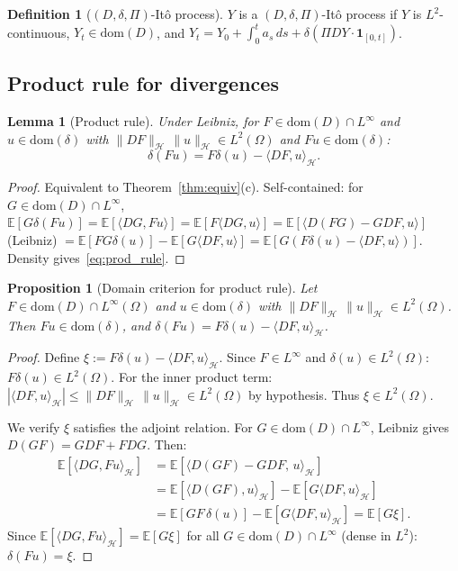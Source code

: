 \documentclass[11pt,a4paper]{article}
\theoremstyle{plain}
\newtheorem{proposition}[theorem]{Proposition}
\newtheorem{lemma}[theorem]{Lemma}
\theoremstyle{definition}
\newtheorem{definition}[theorem]{Definition}
\theoremstyle{remark}
\newcommand{\E}{\mathbb{E}}
\newcommand{\dom}{\mathrm{dom}}
\begin{document}
\begin{definition}[$(D,\delta,\Pi)$-It\^o process]\label{def:ito_proc}
$Y$ is a $(D,\delta,\Pi)$-It\^o process if $Y$ is $L^2$-continuous, $Y_t \in \dom(D)$, and $Y_t = Y_0+\int_0^ta_s\,ds+\delta(\Pi DY\cdot\mathbf{1}_{[0,t]})$.
\end{definition}

\subsection{Product rule for divergences}

\begin{lemma}[Product rule]\label{lem:prod_rule}
Under Leibniz, for $F \in \dom(D)\cap L^\infty$ and $u \in \dom(\delta)$ with $\|DF\|_{\mathcal{H}}\,\|u\|_{\mathcal{H}} \in L^2(\Omega)$ and $Fu \in \dom(\delta)$:
\begin{equation}\label{eq:prod_rule}
\delta(Fu) = F\delta(u) - \langle DF, u\rangle_{\mathcal{H}}.
\end{equation}
\end{lemma}

\begin{proof}
Equivalent to Theorem~\ref{thm:equiv}(c). Self-contained: for $G \in \dom(D)\cap L^\infty$, $\E[G\delta(Fu)] = \E[\langle DG,Fu\rangle] = \E[F\langle DG,u\rangle] = \E[\langle D(FG)-GDF,u\rangle]$ (Leibniz) $= \E[FG\delta(u)]-\E[G\langle DF,u\rangle] = \E[G(F\delta(u)-\langle DF,u\rangle)]$. Density gives~\eqref{eq:prod_rule}.
\end{proof}

\begin{proposition}[Domain criterion for product rule]\label{prop:domain}
Let $F \in \dom(D)\cap L^\infty(\Omega)$ and $u \in \dom(\delta)$ with $\|DF\|_{\mathcal{H}}\,\|u\|_{\mathcal{H}} \in L^2(\Omega)$. Then $Fu \in \dom(\delta)$, and $\delta(Fu) = F\delta(u) - \langle DF, u\rangle_{\mathcal{H}}$.
\end{proposition}

\begin{proof}
Define $\xi := F\delta(u) - \langle DF, u\rangle_{\mathcal{H}}$. Since $F \in L^\infty$ and $\delta(u) \in L^2(\Omega)$: $F\delta(u) \in L^2(\Omega)$. For the inner product term: $|\langle DF, u\rangle_{\mathcal{H}}| \le \|DF\|_{\mathcal{H}}\,\|u\|_{\mathcal{H}} \in L^2(\Omega)$ by hypothesis. Thus $\xi \in L^2(\Omega)$.

We verify $\xi$ satisfies the adjoint relation. For $G \in \dom(D) \cap L^\infty$, Leibniz gives $D(GF) = GDF + FDG$. Then:
\begin{align*}
\E[\langle DG, Fu\rangle_{\mathcal{H}}] &= \E[\langle D(GF) - GDF,\, u\rangle_{\mathcal{H}}] \\
&= \E[\langle D(GF), u\rangle_{\mathcal{H}}] - \E[G\langle DF, u\rangle_{\mathcal{H}}] \\
&= \E[GF\,\delta(u)] - \E[G\langle DF, u\rangle_{\mathcal{H}}] = \E[G\xi].
\end{align*}
Since $\E[\langle DG, Fu\rangle_{\mathcal{H}}] = \E[G\xi]$ for all $G \in \dom(D)\cap L^\infty$ (dense in $L^2$): $\delta(Fu) = \xi$.
\end{proof}
\end{document}
